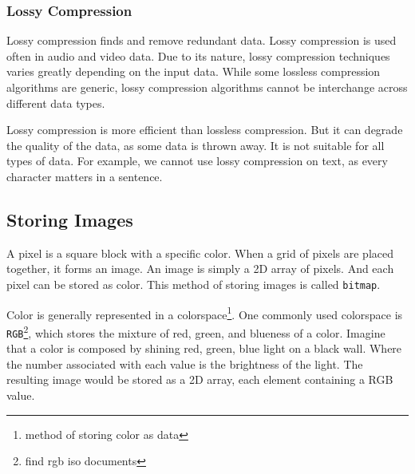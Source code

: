 \documentclass{article}
\begin{document}
\subsubsection{Lossy Compression}
Lossy compression finds and remove redundant data.
Lossy compression is used often in audio and video data.
Due to its nature, lossy compression techniques varies greatly depending on the input data.
While some lossless compression algorithms are generic, lossy compression algorithms cannot be interchange across different data types.

Lossy compression is more efficient than lossless compression.
But it can degrade the quality of the data, as some data is thrown away.
It is not suitable for all types of data.
For example, we cannot use lossy compression on text, as every character matters in a sentence.

\subsection{Storing Images}\label{RGB}
A pixel is a square block with a specific color.
When a grid of pixels are placed together, it forms an image.
An image is simply a 2D array of pixels.
And each pixel can be stored as color.
This method of storing images is called \texttt{bitmap}.

Color is generally represented in a colorspace\footnote{method of storing color as data}.
One commonly used colorspace is \texttt{RGB}\footnote{find rgb iso documents}, which stores the mixture of red, green, and blueness of a color.
Imagine that a color is composed by shining red, green, blue light on a black wall.
Where the number associated with each value is the brightness of the light.
The resulting image would be stored as a 2D array, each element containing a RGB value.
\end{document}
